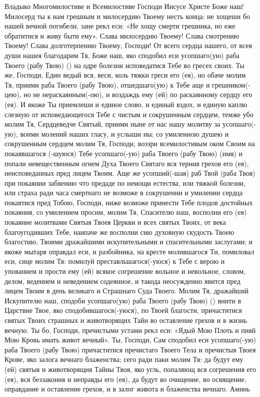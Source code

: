 \begin{mymulticols}
 




Владыко Многомилостиве и Всемилостиве Господи Иисусе Христе Боже наш! Милосерд ты к нам грешным и милосердию Твоему несть конца: не хощеши бо нашей вечной погибели, зане рекл еси: «Не хощу смерти грешника, но еже обратитися и живу быти ему». Слава милосердию Твоему! Слава смотрению Твоему! Слава долготерпению Твоему, Господи! От всего сердца нашего, от всея души нашея благодарим Тя, Боже наш, яко сподобил еси усопшаго(ую) раба Твоего (рабу Твою) () на одре болезни исповедатися Тебе во гресех своих. Ты же, Господи, Един ведый вся, веси, коль тяжки греси его (ея), но обаче молим Тя, приими раба Твоего (рабу Твою), отшедшаго(ую) к Тебе аще и грешником(-цею), но не нераскаянным(-ою), и воздаждь ему (ей) по раскаянному сердцу его (ея). И якоже Ты приемлеши и единое слово, и единый вздох, и единую каплю слезную от исповедающегося Тебе с чистым и сокрушенным сердцем, темже убо молим Тя, Сердцеведче Святый, приими ныне от нас нашу молитву за усопшаго(-ую), вонми молений наших гласу, и услыши ны; со умиленною душею и сокрушенным сердцем молим Тя, Господи, воззри всемилостивым оком Своим на покаявшагося (-шуюся) Тебе усопшаго(-ую) раба Твоего (рабу Твою) (имя) и попали невещественным огнем Духа Твоего Святаго вся терния грехов его (ея), неисповеданных пред лицем Твоим. Аще же усопший(-шая) раб Твой (раба Твоя) при покаянии забвению что предаде по немощи естества, или тяжкой болезни, или страха ради часа смертнаго не возможе в сокрушении и умилении сердца покаятися пред Тобою, Господи, ниже возможе принести Тебе плодов достойных покаяния, со умилением просим, молим Тя, Спасителю наш, восполни его (ея) покаяние молитвами Святыя Твоея Церкви и всех святых Твоих, от века благоугодивших Тебе, наипаче же восполни сию духовную скудость Твоею благостию, Твоими дражайшими искупительными и спасительными заслугами; и якоже мытаря оправдал еси, и разбойника, на кресте молившагося Ти, помиловал еси, сице молим Тя: помилуй преставльшагося(-уюся) к Тебе с верою и упованием и прости ему (ей) всякое согрешение вольное и невольное, словом, делом, ведением и неведением содеянное, и такода неосужденно явится пред лицем Твоим в день великаго и Страшнаго Суда Твоего. Молим Тя, дражайший Искупителю наш, сподоби усопшаго(ую) раба Твоего (рабу Твою) () внити в Царствие Твое, яко сподобившагося(-уюся), по Твоей благости, причаститися святых Твоих страшных и животворящих Тайн во оставление грехов и в жизнь вечную. Ты бо, Господи, пречистыми устами рекл еси: «Ядый Мою Плоть и пияй Мою Кровь имать живот вечный». Ты, Господи, Сам сподобил еси усопшаго(-ую) раба Твоего (рабу Твою) причаститися пречистаго Твоего Тела и пречистыя Твоея Крове, яко залога вечнаго блаженства; сего ради паки молим Тя: да будут ему (ей) святыя и животворящия Тайны Твоя, яко угль, попаляющ вся согрешения его (ея), вся беззакония и неправды его (ея), да будут во очищение, во освящение, оправдание и оставление грехов, и в залог живота и блаженства вечнаго. Аминь 


\end{mymulticols}
